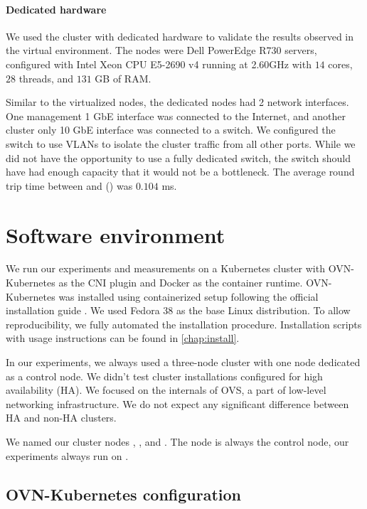 \paragraph{Dedicated hardware}

We used the cluster with dedicated hardware to validate the results observed in the virtual environment. The nodes were Dell PowerEdge R730 servers, configured with Intel\textsuperscript{\textregistered} Xeon\textsuperscript{\textregistered} CPU E5-2690 v4 running at 2.60GHz with $14$ cores, $28$ threads, and $131$ GB of RAM.

Similar to the virtualized nodes, the dedicated nodes had 2 network interfaces. One management 1 GbE interface was connected to the Internet, and another cluster only 10 GbE interface was connected to a switch. We configured the switch to use VLANs to isolate the cluster traffic from all other ports. While we did not have the opportunity to use a fully dedicated switch, the switch should have had enough capacity that it would not be a bottleneck. The average round trip time between  and  () was $0.104$ ms.

\section{Software environment}
\label{sec:sw-env}

We run our experiments and measurements on a Kubernetes cluster with OVN-Kubernetes as the CNI plugin and Docker as the container runtime. OVN-Kubernetes was installed using containerized setup following the official installation guide \cite{OVNInstallGuide}. We used Fedora 38 as the base Linux distribution. To allow reproducibility, we fully automated the installation procedure. Installation scripts with usage instructions can be found in \cref{chap:install}.

In our experiments, we always used a three-node cluster with one node dedicated as a control node. We didn't test cluster installations configured for high availability (HA). We focused on the internals of OVS, a part of low-level networking infrastructure. We do not expect any significant difference between HA and non-HA clusters.

We named our cluster nodes , , and . The node  is always the control node, our experiments always run on .

\subsection{OVN-Kubernetes configuration}
\label{subsec:ovnkube-limits}


